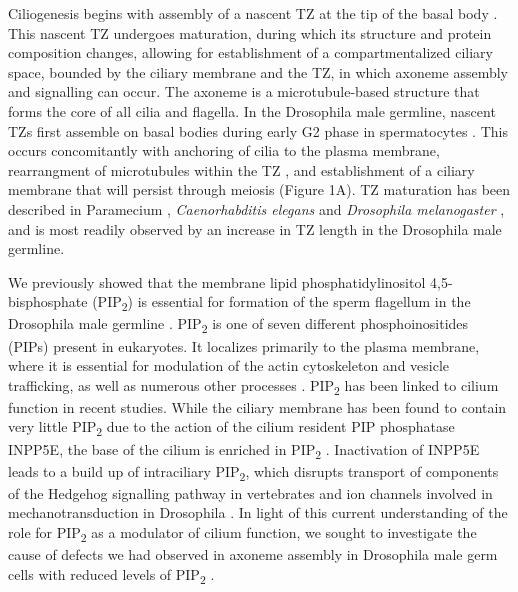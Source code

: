\documentclass[12pt, twoside, letterpaper]{article}
\newcommand{\PIP}{PIP\textsubscript{2}}
\begin{document}
\begin{doublespacing}
\begin{linenumbers}
    Ciliogenesis begins with assembly of a nascent TZ at the tip of
    the basal body \citep{reiter2012base}.
    This nascent TZ undergoes maturation, during which its structure and protein
    composition changes, allowing for
    establishment of a compartmentalized ciliary space, bounded by the ciliary membrane
    and the TZ, in which axoneme assembly and signalling can occur.
    The axoneme is a microtubule-based structure that forms the core of all cilia and flagella.
    In the Drosophila male germline, nascent TZs first assemble on basal bodies
    during early G2 phase in spermatocytes \citep{riparbelli2012assembly}.
    This occurs concomitantly with anchoring of cilia to the plasma membrane,
    rearrangment of microtubules within the TZ \citep{gottardo2013cilium},
    and establishment of a
    ciliary membrane that will persist through meiosis
    \citep{riparbelli2012assembly} (Figure 1A).
    TZ maturation has been described in
    Paramecium \citep{aubusson2015transition},
    \textit{Caenorhabditis elegans} \citep{serwas2017centrioles} and
    \textit{Drosophila melanogaster} \citep{gottardo2013cilium},
    and is most readily observed by an increase in TZ length
    in the Drosophila male germline.

    We previously showed that the membrane lipid phosphatidylinositol 4,5-bisphosphate
    (\PIP{}) is essential for formation of the sperm flagellum in the Drosophila
    male germline \citep{wei2008depletion, fabian2010phosphatidylinositol}.
    \PIP{} is one of seven different phosphoinositides (PIPs) present in eukaryotes.
    It localizes primarily to the plasma membrane, where it is essential for
    modulation of the actin cytoskeleton and vesicle trafficking, as well as numerous
    other processes \citep{balla2013phosphoinositides}.
    \PIP{} has been linked to cilium function in recent studies.
    While the ciliary membrane has been found to contain very little \PIP{} due to the action
    of the cilium resident PIP phosphatase INPP5E,
    the base of the cilium is enriched in \PIP{}
    \citep{nakatsu2015phosphoinositide}.
    Inactivation of INPP5E leads to a build up of intraciliary \PIP{},
    which disrupts transport of components of the Hedgehog signalling pathway in vertebrates
    \citep{chavez2015modulation, garcia2015phosphoinositides, conduit2017compartmentalized}
    and ion channels involved in mechanotransduction in Drosophila \citep{park2015ciliary}.
    In light of this current understanding of the role
    for \PIP{} as a modulator of cilium function,
    we sought to investigate the cause of defects we had observed
    in axoneme assembly in Drosophila male germ cells
    with reduced levels of \PIP{} \citep{wei2008depletion, fabian2010phosphatidylinositol}.


\end{linenumbers}
\end{doublespacing}
\end{document}

